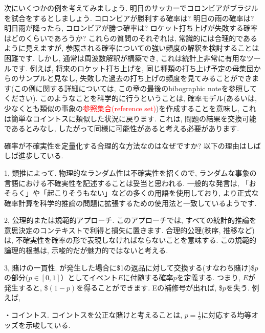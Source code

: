 \documentclass[10pt,dvipdfmx,a4]{beamer}
\newcommand{\tcr}[1]{\textcolor{red}{#1}}
\begin{document}

\begin{frame}
次にいくつかの例を考えてみましょう.
明日のサッカーでコロンビアがブラジルを試合をするとしましょう.
コロンビアが勝利する確率は?
明日の雨の確率は?
明日雨が降ったら, コロンビアが勝つ確率は?
ロケット打ち上げが失敗する確率はどのくらいであろうか?
これらの質問のそれぞれは, 常識的には合理的であるように見えますが, 参照される確率についての強い頻度の解釈を検討することは困難です.
しかし, 通常は周波数解釈が構築でき, これは統計上非常に有用なツールです.
例えば, 将来のロケット打ち上げを, 同じ種類の打ち上げ予定の母集団からのサンプルと見なし, 失敗した過去の打ち上げの頻度を見てみることができます(この例に関する詳細については, この章の最後のbibographic noteを参照してください).
このようなことを科学的に行うということは, 確率モデル(あるいは, 少なくとも類似の事象の\tcr{参照集合(reference set)})を作成することを意味し, これは簡単なコイントスに類似した状況に戻ります.
これは, 問題の結果を交換可能であるとみなし, したがって同様に可能性があると考える必要があります.
\end{frame}


\begin{frame}
確率が不確実性を定量化する合理的な方法なのはなぜですか?
以下の理由はしばしば進歩している.

1, 類推によって.
物理的なランダム性は不確実性を招くので, ランダムな事象の言語における不確実性を記述することは妥当と思われる.
一般的な発言は, 「おそらく」や「起こりそうもない」などの多くの用語を使用しており, より正式な確率計算を科学的推論の問題に拡張するための使用法と一致しているようです.

2, 公理的または規範的アプローチ.
このアプローチでは, すべての統計的推論を意思決定のコンテキストで利得と損失に置きます.
合理的公理(秩序, 推移など)は, 不確実性を確率の形で表現しなければならないことを意味する.
この規範的論理的根拠は, 示唆的だが魅力的ではないと考える.

3, 賭けの一貫性.
が発生した場合に\$1の返品に対して交換する(すなわち賭け)\$$p$の部分($p\in[0,1]$）としてイベント$E$に付随する確率$p$を定義する.
つまり, $E$が発生すると, \$$(1-p)$を得ることができます.
Eの補修号が出れば, \$$p$を失う.
例えば,

・コイントス.
コイントスを公正な賭けと考えることは, $p=\tfrac{1}{2}$に対応する均等オッズを示唆している.
\end{frame}

\end{document}
